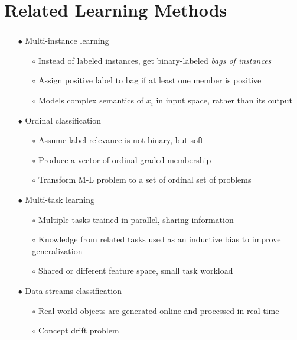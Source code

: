 \documentclass{beamer}
\begin{document}
\section{Related Learning Methods}
\begin{frame}
\frametitle{\insertsection}
\begin{itemize}
\item[$\bullet$] Multi-instance learning
\begin{itemize}
\item[$\circ$] Instead of labeled instances, get binary-labeled \emph{bags of instances}
\item[$\circ$] Assign positive label to bag if at least one member is positive
\item[$\circ$] Models complex semantics of $x_i$ in input space, rather than its output
\end{itemize}
\item[$\bullet$] Ordinal classification
\begin{itemize}
\item[$\circ$] Assume label relevance is not binary, but soft
\item[$\circ$] Produce a vector of ordinal graded membership
\item[$\circ$] Transform M-L problem to a set of ordinal set of problems
\end{itemize}
\item[$\bullet$] Multi-task learning
\begin{itemize}
\item[$\circ$] Multiple tasks trained in parallel, sharing information
\item[$\circ$] Knowledge from related tasks used as an inductive bias to improve generalization
\item[$\circ$] Shared or different feature space, small task workload
\end{itemize}
\item[$\bullet$] Data streams classification
\begin{itemize}
\item[$\circ$] Real-world objects are generated online and processed in  real-time
\item[$\circ$] Concept drift problem
\end{itemize}
\end{itemize}
\end{frame}

\end{document}
